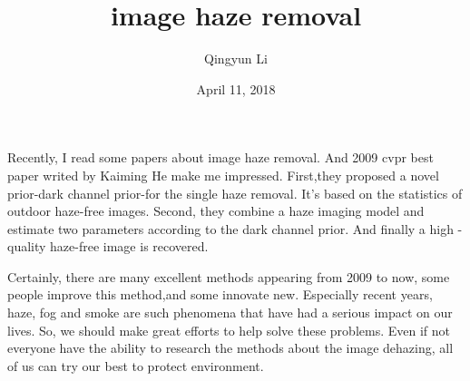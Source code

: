 \documentclass{article}
\author{Qingyun Li}
\date{April 11, 2018}
\title{image haze removal}
\begin{document}
\maketitle
\par Recently, I read some papers about image haze removal. And 2009 cvpr best paper writed by Kaiming He make me impressed. First,they proposed a novel prior-dark channel prior-for the single haze removal. It's based on the statistics of outdoor haze-free images. Second, they combine a haze imaging model and estimate two parameters according to the dark channel prior. And finally a high -quality haze-free image is recovered.
\par Certainly, there are many excellent methods appearing from 2009 to now, some people improve this method,and some innovate new. Especially recent years, haze, fog and smoke are such phenomena that have had a serious impact on our lives. So, we should make great efforts to help solve these problems. Even if not everyone have the ability to research the methods about the image dehazing, all of us can try our best to protect environment.
\end{document}
